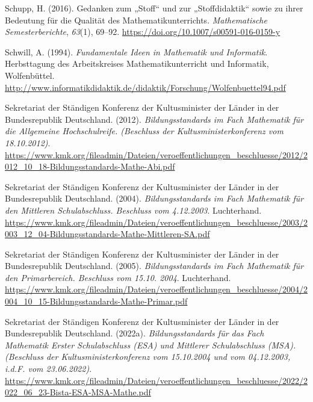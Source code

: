 \documentclass[
]{scrbook}
\newlength{\cslhangindent}
\newlength{\cslentryspacingunit} %
\newenvironment{CSLReferences}[2] %
 {%
  \setlength{\parindent}{0pt}
  \ifodd #1
  \let\oldpar\par
  \def\par{\hangindent=\cslhangindent\oldpar}
  \fi
  \setlength{\parskip}{#2\cslentryspacingunit}
 }%
 {}
\theoremstyle{definition}
\theoremstyle{definition}
\theoremstyle{definition}
\theoremstyle{definition}
\theoremstyle{remark}
\begin{document}
\begin{CSLReferences}{1}{0}
\leavevmode{}%
Schupp, H. (2016). Gedanken zum „{Stoff}`` und zur „{Stoffdidaktik}`` sowie zu ihrer {Bedeutung} für die {Qualität} des {Mathematikunterrichts}. \emph{Mathematische Semesterberichte}, \emph{63}(1), 69--92. \url{https://doi.org/10.1007/s00591-016-0159-y}

\leavevmode{}%
Schwill, A. (1994). \emph{Fundamentale {Ideen} in {Mathematik} und {Informatik}}. Herbsttagung des Arbeitskreises Mathematikunterricht und Informatik, Wolfenbüttel. \url{http://www.informatikdidaktik.de/didaktik/Forschung/Wolfenbuettel94.pdf}

\leavevmode{}%
Sekretariat der Ständigen Konferenz der Kultusminister der Länder in der Bundesrepublik Deutschland. (2012). \emph{Bildungsstandards im {Fach} {Mathematik} für die {Allgemeine} {Hochschulreife}. (Beschluss der Kultusministerkonferenz vom 18.10.2012)}. \url{https://www.kmk.org/fileadmin/Dateien/veroeffentlichungen_beschluesse/2012/2012_10_18-Bildungsstandards-Mathe-Abi.pdf}

\leavevmode{}%
Sekretariat der Ständigen Konferenz der Kultusminister der Länder in der Bundesrepublik Deutschland. (2004). \emph{Bildungsstandards im {Fach} {Mathematik} für den {Mittleren} {Schulabschluss}. {Beschluss} vom 4.12.2003}. Luchterhand. \url{https://www.kmk.org/fileadmin/Dateien/veroeffentlichungen_beschluesse/2003/2003_12_04-Bildungsstandards-Mathe-Mittleren-SA.pdf}

\leavevmode{}%
Sekretariat der Ständigen Konferenz der Kultusminister der Länder in der Bundesrepublik Deutschland. (2005). \emph{Bildungsstandards im {Fach} {Mathematik} für den {Primarbereich}. {Beschluss} vom 15.10. 2004}. Luchterhand. \url{https://www.kmk.org/fileadmin/Dateien/veroeffentlichungen_beschluesse/2004/2004_10_15-Bildungsstandards-Mathe-Primar.pdf}

\leavevmode{}%
Sekretariat der Ständigen Konferenz der Kultusminister der Länder in der Bundesrepublik Deutschland. (2022a). \emph{Bildungsstandards für das {Fach} {Mathematik} {Erster} {Schulabschluss} ({ESA}) und {Mittlerer} {Schulabschluss} ({MSA}). ({Beschluss} der {Kultusministerkonferenz} vom 15.10.2004 und vom 04.12.2003, i.d.{F}. vom 23.06.2022)}. \url{https://www.kmk.org/fileadmin/Dateien/veroeffentlichungen_beschluesse/2022/2022_06_23-Bista-ESA-MSA-Mathe.pdf}


\end{CSLReferences}
\end{document}
